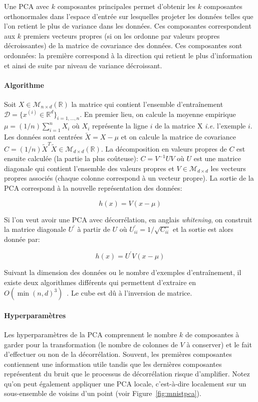 Une PCA avec $k$ composantes principales permet d'obtenir les $k$ composantes
orthonormales dans l'espace d'entrée sur lesquelles projeter les données telles
que l'on retient le plus de variance dans les données. Ces composantes
correspondent aux $k$ premiers vecteurs propres (si on les ordonne par valeurs
propres décroissantes) de la matrice de covariance des données.  Ces
composantes sont ordonnées: la première correspond à la direction qui retient
le plus d'information et ainsi de suite par niveau de variance décroissant.

\paragraph{Algorithme} Soit $X\in\mathcal{M}_{n\times d}(\mathbb{R})$ la
matrice qui contient l'ensemble d'entraînement $\mathcal{D}=\lbrace
x^{(i)}\in\mathbb{R}^d \rbrace_{i=1,\dots,n}$.  En premier lieu, on calcule la
moyenne empirique $\mu=(1/n)\sum_{i=1}^{n}X_i$ où $X_i$ représente la ligne $i$
de la matrice X \textit{i.e.} l'exemple $i$. Les données sont centrées
$\tilde{X}=X-\mu$ et on calcule la matrice de covariance
$C=(1/n)\tilde{X}^T\tilde{X}\in\mathcal{M}_{d\times d}(\mathbb{R})$. La décomposition en valeurs propres de $C$ est
ensuite calculée (la partie la plus co\^uteuse): $C=V^{-1}UV$ où
$U$ est une matrice diagonale qui contient l'ensemble des valeurs propres
et $V\in\mathcal{M}_{d\times d}$ les vecteurs propres associés (chaque colonne
correspond à un vecteur propre). La sortie de la PCA correspond à la nouvelle représentation des données:

\begin{equation}
h(x)=V(x-\mu)
\end{equation}

Si l'on veut avoir une PCA avec décorrélation, en anglais \textit{whitening}, on construit la matrice
diagonale $U^{'}$ à partir de $U$ où $U^{'}_{ii}=1/\sqrt{C_{ii}}$ et la sortie
est alors donnée par:

\begin{equation}
h(x)=U^{'}V(x-\mu)
\end{equation}


Suivant la dimension des données ou le nombre d'exemples d'entraînement, il
existe deux algorithmes différents qui permettent d'extraire en
$O(\min(n,d)^3)$~\citep{bishop-book2006}.  Le cube est dû à l'inversion de
matrice.

\paragraph{Hyperparamètres} Les hyperparamètres de la PCA comprennent le
nombre $k$ de composantes à garder pour la transformation (le nombre de
colonnes de $V$ à conserver) et le fait d'effectuer ou non de la décorrélation. Souvent, les premières composantes contiennent une
information utile tandis que les dernières composantes représentent du bruit
que le processus de décorrélation risque d'amplifier.  Notez qu'on peut également
appliquer une PCA locale, c'est-à-dire localement sur un sous-ensemble de
voisins d'un point (voir Figure~\ref{fig:mnistpca}).


